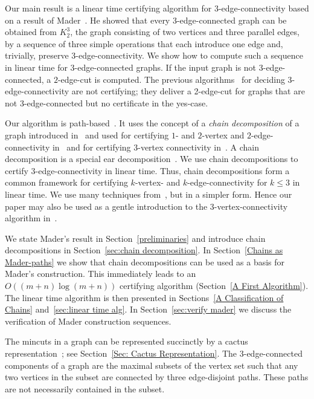 \documentclass[paper=a4]{scrartcl}
\begin{document}
Our main result is a linear time certifying algorithm for $3$-edge-connectivity based on a result of Mader~\cite{Mader1978}. He showed that every 3-edge-connected graph can be obtained from $K_2^3$, the graph consisting of two vertices and three parallel edges, by a sequence of three simple operations that each introduce one edge and, trivially, preserve 3-edge-connectivity. We show how to compute such a sequence in linear time for $3$-edge-connected graphs. If the input graph is not $3$-edge-connected, a $2$-edge-cut is computed. The previous algorithms~\cite{Galil1991,Nagamochi1992a,Taoka1992,Tsin2007,Tsin2009} for deciding 3-edge-connectivity are not certifying; they deliver a 2-edge-cut for graphs that are not 3-edge-connected but no certificate in the yes-case.

Our algorithm is path-based~\cite{Gabow2000}. It uses the concept of a \emph{chain decomposition} of a graph introduced in~\cite{Schmidt2010b} and used for certifying $1$- and $2$-vertex and $2$-edge-connectivity in~\cite{Schmidt2013a} and for certifying $3$-vertex connectivity in~\cite{Schmidt2013}. 
A chain decomposition is a special ear decomposition~\cite{Lovasz1985}. 
We use chain decompositions to certify 3-edge-connectivity in linear time. Thus, chain decompositions form a common framework for certifying $k$-vertex- and $k$-edge-connectivity for $k \le 3$ in linear time. We use many techniques from~\cite{Schmidt2013}, but in a simpler form. Hence our paper may also be used as a gentle introduction to the 3-vertex-connectivity algorithm in~\cite{Schmidt2013}.

We state Mader's result in Section~\ref{preliminaries} and introduce chain decompositions in Section~\ref{sec:chain decomposition}. In Section~\ref{Chains as Mader-paths} we show that chain decompositions can be used as a basis for Mader's construction. This immediately leads to an $O((m + n) \log(m + n))$ certifying algorithm (Section~\ref{A First Algorithm}). The linear time algorithm is then presented in Sections~\ref{A Classification of Chains} and~\ref{sec:linear time alg}. In Section~\ref{sec:verify mader} we discuss the verification of Mader construction sequences.

The mincuts in a graph can be represented succinctly by a cactus representation~\cite{Dinits-Karzanov-Lomonosov,Nagamochi-Ibaraki-Book,Fleiner2009}; see Section~\ref{Sec: Cactus Representation}. The 3-edge-connected components of a graph are the maximal subsets of the vertex set such that any two vertices in the subset are connected by three edge-disjoint paths. These paths are not necessarily contained in the subset. 
\end{document}

